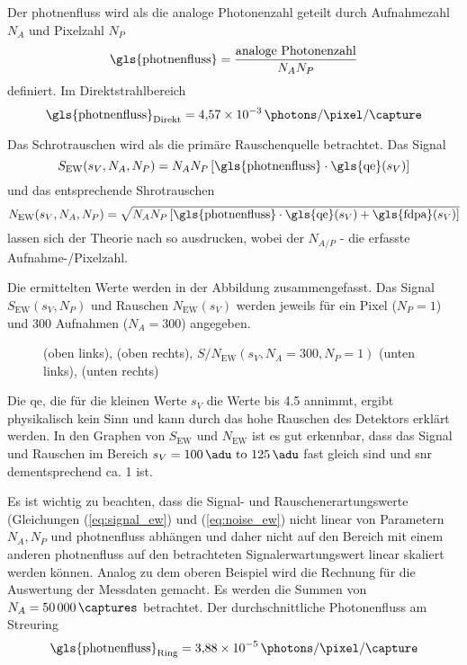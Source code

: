 \noindent
Der \gls{photnenfluss} wird als die analoge Photonenzahl geteilt durch Aufnahmezahl $N_A$ und Pixelzahl $N_P$
\begin{equation}
    \text{\gls{photnenfluss}} = \frac{\text{analoge Photonenzahl}}{N_A N_P}
\end{equation}
definiert. Im Direktstrahlbereich
\begin{equation}
   \text{\gls{photnenfluss}}_\text{Direkt} = \SI{4.57e-3}{\photons\per\pixel\per\capture}
\end{equation}


\noindent
Das Schrotrauschen wird als die primäre Rauschenquelle betrachtet. Das Signal 
\begin{equation}
        S_{\text{EW}}(s_V, N_A, N_P) = N_{A}N_{P}\left[\text{\gls{photnenfluss}}\cdot\text{\gls{qe}}(s_V)\right]
        \label{eq:signal_ew}
\end{equation}
und das entsprechende Shrotrauschen 
\begin{equation}
        N_{\text{EW}}(s_V, N_A, N_P) = \sqrt{N_{A}N_{P}\left[\text{\gls{photnenfluss}}\cdot\text{\gls{qe}}(s_V) + \text{\gls{fdpa}}(s_V)\right]}
        \label{eq:noise_ew}
\end{equation}
lassen sich der Theorie nach so ausdrucken, wobei der $N_{A/P}$ - die erfasste Aufnahme-/Pixelzahl. 

\noindent
Die ermittelten Werte werden in der Abbildung zusammengefasst. Das Signal $S_{\text{EW}}(s_V, N_P)$ und Rauschen $ N_{\text{EW}}(s_V)$ werden jeweils für ein Pixel ($N_P = 1$) und 300 Aufnahmen ($N_A = 300$) angegeben.
\begin{figure}[H]
    \centering
    
    \caption{(oben links), (oben rechts), $S/N_{\text{EW}}(s_V, N_A = 300, N_P = 1)$ (unten links), (unten rechts)}
    \label{fig:qe_fehldetektiert_signal_noise}
\end{figure}
\noindent
Die \gls{qe}, die für die kleinen Werte $s_V$ die Werte bis \num{4,5} annimmt, ergibt physikalisch kein Sinn und kann durch das hohe Rauschen des Detektors erklärt werden. In den Graphen von $S_{\text{EW}}$ und $N_{\text{EW}}$ ist es gut erkennbar, dass das Signal und Rauschen im Bereich $s_V = \text{\SIrange{100}{125}{\adu}}$ fast gleich sind und \gls{snr} dementsprechend ca. 1 ist.

\noindent
Es ist wichtig zu beachten, dass die Signal- und Rauschenerartungswerte (Gleichungen (\ref{eq:signal_ew}) und  (\ref{eq:noise_ew}) nicht linear von Parametern $N_A, N_P$ und \gls{photnenfluss} abhängen und daher nicht auf den Bereich mit einem anderen \gls{photnenfluss} auf den betrachteten Signalerwartungswert linear skaliert werden können. Analog zu dem oberen Beispiel wird die Rechnung für die Auswertung der Messdaten gemacht. Es werden die Summen von $N_A = \SI{50000}{\captures}$ betrachtet. Der durchschnittliche Photonenfluss am Streuring
\begin{equation}
    \text{\gls{photnenfluss}}_\text{Ring}  = \SI{3.88e-5}{\photons\per\pixel\per\capture}
\end{equation}


